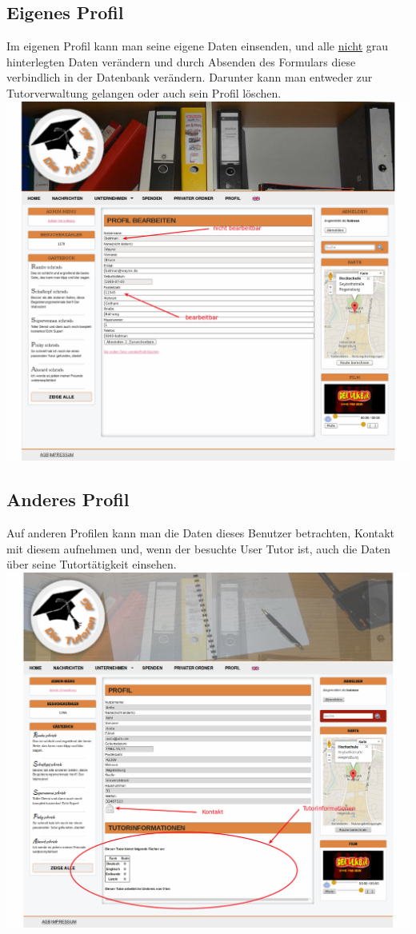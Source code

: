 \newpage

\subsection{Eigenes Profil}
Im eigenen Profil kann man seine eigene Daten einsenden, und alle \underline{nicht} grau hinterlegten Daten verändern und durch Absenden des Formulars diese \\ verbindlich in der Datenbank verändern.
Darunter kann man entweder zur Tutorverwaltung gelangen oder auch sein Profil löschen.\\
\includegraphics[width=1\textwidth]{../Screenshots/de/Profil-bearbeiten}

\newpage

\subsection{Anderes Profil}
Auf anderen Profilen kann man die Daten dieses Benutzer betrachten, Kontakt mit diesem aufnehmen und, wenn der besuchte User Tutor ist, auch die Daten über seine Tutortätigkeit einsehen.\\
\includegraphics[width=1\textwidth]{../Screenshots/de/Profil_bearbeiten_fremdes}